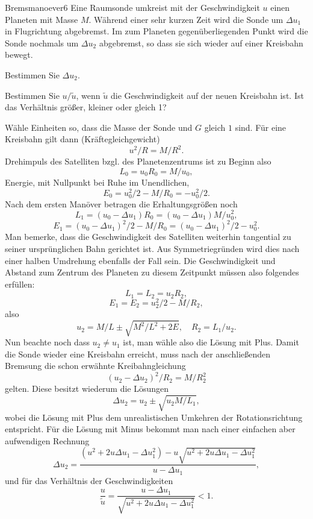 \begin{problem}{Bremsmanoever}{6}
Eine Raumsonde umkreist mit der Geschwindigkeit $u$ einen Planeten mit Masse $M$.
Während einer sehr kurzen Zeit wird die Sonde um $\Delta u_1$ in Flugrichtung abgebremst.
Im zum Planeten gegenüberliegenden Punkt wird die Sonde nochmals um $\Delta u_2$ abgebremst,
so dass sie sich wieder auf einer Kreisbahn bewegt.
\begin{abcenum}
\item Bestimmen Sie $\Delta u_2$.
\item Bestimmen Sie $u/\tilde u$, wenn $\tilde u$ die Geschwindigkeit auf der neuen Kreisbahn ist. Ist das Verhältnis größer, kleiner oder gleich 1?
\end{abcenum}
\begin{solution}
Wähle Einheiten so, dass die Masse der Sonde und $G$ gleich $1$ sind.
Für eine Kreisbahn gilt dann (Kräftegleichgewicht)
\[
u^2 / R = M / R^2.
\]
Drehimpuls des Satelliten bzgl. des Planetenzentrums ist zu Beginn also
\[
L_0 = u_0 R_0 = M / u_0,
\]
Energie, mit Nullpunkt bei Ruhe im Unendlichen,
\[
E_0 = u_0^2 / 2 - M / R_0 = - u_0^2 / 2.
\]
Nach dem ersten Manöver betragen die Erhaltungsgrößen noch
\[
L_1 = (u_0 - \Delta u_1) R_0 = (u_0 - \Delta u_1) M / u_0^2,
\]
\[
E_1 = (u_0 - \Delta u_1)^2 / 2 - M / R_0 = (u_0 - \Delta u_1)^2 / 2 - u_0^2.
\]
Man bemerke, dass die Geschwindigkeit des Satelliten weiterhin tangential zu seiner ursprünglichen Bahn gerichtet ist. Aus Symmetriegründen wird dies nach einer halben Umdrehung ebenfalls der Fall sein. Die Geschwindigkeit und Abstand zum Zentrum des Planeten zu diesem Zeitpunkt müssen also folgendes erfüllen:
\[
L_1 = L_2 = u_2 R_2,
\]
\[
E_1 = E_2 = u_2^2 / 2 - M / R_2,
\]
also
\[
u_2 = M/L \pm \sqrt{M^2/L^2 + 2E}, \quad R_2 = L_1/u_2.
\]
Nun beachte noch dass $u_2 \neq u_1$ ist, man wähle also die Lösung mit Plus. Damit die Sonde wieder eine Kreisbahn erreicht, muss nach der anschließenden Bremsung die schon erwähnte Kreibahngleichung
\[
(u_2 - \Delta u_2)^2 / R_2 = M / R_2^2
\]
gelten. Diese besitzt wiederum die Lösungen
\[
\Delta u_2 = u_2 \pm \sqrt{u_2 M / L_1},
\]
wobei die Lösung mit Plus dem unrealistischen Umkehren der Rotationsrichtung entspricht. Für die Lösung mit Minus bekommt man nach einer einfachen aber aufwendigen Rechnung
\[
\Delta u_2=\frac{(u^2+2u\Delta u_1-\Delta u_1^2)-u\sqrt{u^2+2u\Delta u_1-\Delta u_1^2}}{u-\Delta u_1},
\]
und für das Verhältnis der Geschwindigkeiten
\[
\frac{u}{\tilde{u}}=\frac{u-\Delta u_1}{\sqrt{u^2+2u\Delta u_1-\Delta u_1^2}} < 1.
\]
\end{solution}
\end{problem}


